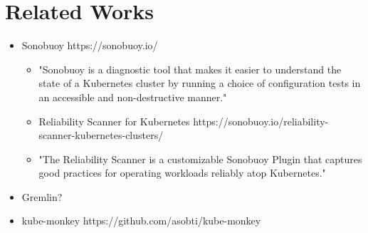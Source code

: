 \chapter{Related Works}

\begin{itemize}
	\item Sonobuoy https://sonobuoy.io/
	\begin{itemize}
		\item "Sonobuoy is a diagnostic tool that makes it easier to understand the state of a Kubernetes cluster by running a choice of configuration tests in an accessible and non-destructive manner."
		\item Reliability Scanner for Kubernetes https://sonobuoy.io/reliability-scanner-kubernetes-clusters/
		\item "The Reliability Scanner is a customizable Sonobuoy Plugin that captures good practices for operating workloads reliably atop Kubernetes."
	\end{itemize}
	\item Gremlin?
	\item kube-monkey https://github.com/asobti/kube-monkey
\end{itemize}